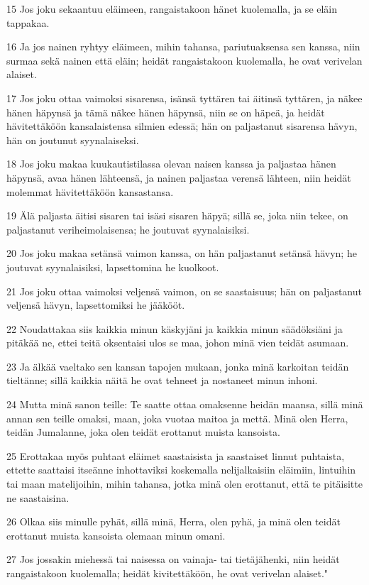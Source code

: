 \par 15 Jos joku sekaantuu eläimeen, rangaistakoon hänet kuolemalla, ja se eläin tappakaa.
\par 16 Ja jos nainen ryhtyy eläimeen, mihin tahansa, pariutuaksensa sen kanssa, niin surmaa sekä nainen että eläin; heidät rangaistakoon kuolemalla, he ovat verivelan alaiset.
\par 17 Jos joku ottaa vaimoksi sisarensa, isänsä tyttären tai äitinsä tyttären, ja näkee hänen häpynsä ja tämä näkee hänen häpynsä, niin se on häpeä, ja heidät hävitettäköön kansalaistensa silmien edessä; hän on paljastanut sisarensa hävyn, hän on joutunut syynalaiseksi.
\par 18 Jos joku makaa kuukautistilassa olevan naisen kanssa ja paljastaa hänen häpynsä, avaa hänen lähteensä, ja nainen paljastaa verensä lähteen, niin heidät molemmat hävitettäköön kansastansa.
\par 19 Älä paljasta äitisi sisaren tai isäsi sisaren häpyä; sillä se, joka niin tekee, on paljastanut veriheimolaisensa; he joutuvat syynalaisiksi.
\par 20 Jos joku makaa setänsä vaimon kanssa, on hän paljastanut setänsä hävyn; he joutuvat syynalaisiksi, lapsettomina he kuolkoot.
\par 21 Jos joku ottaa vaimoksi veljensä vaimon, on se saastaisuus; hän on paljastanut veljensä hävyn, lapsettomiksi he jääkööt.
\par 22 Noudattakaa siis kaikkia minun käskyjäni ja kaikkia minun säädöksiäni ja pitäkää ne, ettei teitä oksentaisi ulos se maa, johon minä vien teidät asumaan.
\par 23 Ja älkää vaeltako sen kansan tapojen mukaan, jonka minä karkoitan teidän tieltänne; sillä kaikkia näitä he ovat tehneet ja nostaneet minun inhoni.
\par 24 Mutta minä sanon teille: Te saatte ottaa omaksenne heidän maansa, sillä minä annan sen teille omaksi, maan, joka vuotaa maitoa ja mettä. Minä olen Herra, teidän Jumalanne, joka olen teidät erottanut muista kansoista.
\par 25 Erottakaa myös puhtaat eläimet saastaisista ja saastaiset linnut puhtaista, ettette saattaisi itseänne inhottaviksi koskemalla nelijalkaisiin eläimiin, lintuihin tai maan matelijoihin, mihin tahansa, jotka minä olen erottanut, että te pitäisitte ne saastaisina.
\par 26 Olkaa siis minulle pyhät, sillä minä, Herra, olen pyhä, ja minä olen teidät erottanut muista kansoista olemaan minun omani.
\par 27 Jos jossakin miehessä tai naisessa on vainaja- tai tietäjähenki, niin heidät rangaistakoon kuolemalla; heidät kivitettäköön, he ovat verivelan alaiset."

